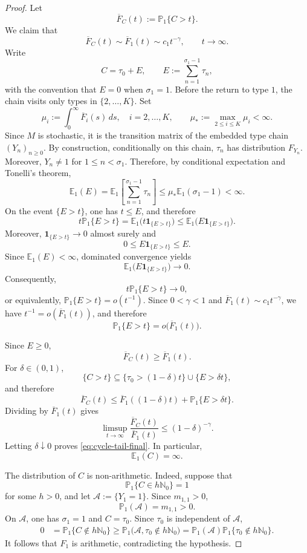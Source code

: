 \documentclass[10pt,a4paper]{amsart}
\newcommand{\E}{\mathbb E}
\newcommand{\N}{\mathbb N}
\newcommand{\Pbb}{\mathbb P}
\newcommand{\ind}[1]{\mathbf 1_{\{#1\}}}
\begin{document}
\begin{proof}
Let
\[
  \overline F_C(t):=\Pbb_1\{C>t\}.
\]
We claim that
\begin{equation}\label{eq:cycle-tail-final}
  \overline F_C(t)
  \sim\overline F_1(t)
  \sim c_1t^{-\gamma},
  \qquad t\to\infty.
\end{equation}
Write
\[
  C=\tau_0+E,
  \qquad
  E:=\sum_{n=1}^{\sigma_1-1}\tau_n,
\]
with the convention that \(E=0\) when \(\sigma_1=1\). Before the return to type \(1\), the chain visits only types in \(\{2,\dots,K\}\). Set
\[
  \mu_i:=\int_0^\infty\overline F_i(s)\,ds,\quad i=2,\dots,K,
  \qquad
  \mu_*:=\max_{2\le i\le K}\mu_i<\infty.
\]
Since \(M\) is stochastic, it is the transition matrix of the embedded type chain \((Y_n)_{n\ge0}\). By construction, conditionally on this chain, \(\tau_n\) has distribution \(F_{Y_n}\). Moreover, \(Y_n\ne1\) for \(1\le n<\sigma_1\). Therefore, by conditional expectation and Tonelli's theorem,
\[
  \E_1(E)
  =
  \E_1\left[\sum_{n=1}^{\sigma_1-1}\tau_{n}\right]
  \le
  \mu_*\E_1(\sigma_1-1)
  <\infty.
\]
On the event \(\{E>t\}\), one has \(t\le E\), and therefore
\[
  t\Pbb_1\{E>t\}
  =
  \E_1\bigl(t\ind{E>t}\bigr)
  \le
  \E_1\bigl(E\ind{E>t}\bigr).
\]
Moreover, \(\ind{E>t}\to0\) almost surely and
\[
  0\le E\ind{E>t}\le E.
\]
Since \(\E_1(E)<\infty\), dominated convergence yields
\[
  \E_1\bigl(E\ind{E>t}\bigr)\longrightarrow0.
\]
Consequently,
\[
  t\Pbb_1\{E>t\}\longrightarrow0,
\]
or equivalently, \(\Pbb_1\{E>t\}=o(t^{-1})\). Since \(0<\gamma<1\) and \(\overline F_1(t)\sim c_1t^{-\gamma}\), we have \(t^{-1}=o(\overline F_1(t))\), and therefore
\[
  \Pbb_1\{E>t\}
  =
  o\bigl(\overline F_1(t)\bigr).
\]


Since \(E\ge0\),
\[
  \overline F_C(t)\ge\overline F_1(t).
\]
For \(\delta\in(0,1)\),
\[
  \{C>t\}
  \subseteq
  \{\tau_0>(1-\delta)t\}\cup\{E>\delta t\},
\]
and therefore
\[
  \overline F_C(t)
  \le
  \overline F_1((1-\delta)t)+\Pbb_1\{E>\delta t\}.
\]
Dividing by \(\overline F_1(t)\) gives
\[
  \limsup_{t\to\infty}
  \frac{\overline F_C(t)}{\overline F_1(t)}
  \le(1-\delta)^{-\gamma}.
\]
Letting \(\delta\downarrow0\) proves \eqref{eq:cycle-tail-final}. In particular,
\[
  \E_1(C)=\infty.
\]

The distribution of \(C\) is non-arithmetic. Indeed, suppose that
\[
  \Pbb_1\{C\in h\N_0\}=1
\]
for some \(h>0\), and let \(\mathcal A:=\{Y_1=1\}\). Since \(m_{1,1}>0\),
\[
  \Pbb_1(\mathcal A)=m_{1,1}>0.
\]
On \(\mathcal A\), one has \(\sigma_1=1\) and \(C=\tau_0\). Since \(\tau_0\) is independent of \(\mathcal A\),
\[
\begin{split}
  0
  &=
  \Pbb_1\{C\notin h\N_0\}\ge
  \Pbb_1\bigl(\mathcal A,\tau_0\notin h\N_0\bigr)=
  \Pbb_1(\mathcal A)\Pbb_1\{\tau_0\notin h\N_0\}.
\end{split}
\]
It follows that \(F_1\) is arithmetic, contradicting the hypothesis.


\end{proof}
\end{document}
